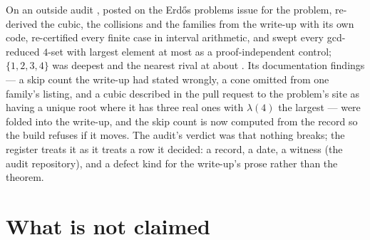 \documentclass[11pt]{article}
\theoremstyle{plain}
\theoremstyle{definition}
\begin{document}
On \LfOutsideDate{} an outside audit \cite{Lambda4Audit}, posted on the Erd\H{o}s problems issue for the problem, re-derived the cubic, the collisions and the families from the write-up with its own code, re-certified every finite case in interval arithmetic, and swept every gcd-reduced $4$-set with largest element at most \LfOutsideMax{} as a proof-independent control; $\{1,2,3,4\}$ was deepest and the nearest rival \LfRival{} at about \LfRivalValue{}. Its \LfFindings{} documentation findings --- a skip count the write-up had stated wrongly, a cone omitted from one family's listing, and a cubic described in the pull request to the problem's site as having a unique root where it has three real ones with $\lambda(4)$ the largest --- were folded into the write-up, and the skip count is now computed from the record so the build refuses if it moves. The audit's verdict was that nothing breaks; the register treats it as it treats a row it decided: a record, a date, a witness (the audit repository), and a defect kind for the write-up's prose rather than the theorem.

\section{What is not claimed}\label{sec:notclaimed}
\end{document}
